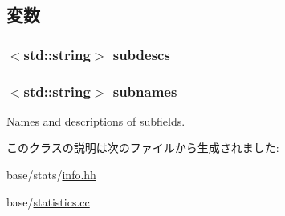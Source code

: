 \subsection{変数}
\hypertarget{classStats_1_1VectorInfo_a722488efce925fb896e4111f77731f25}{
\subsubsection[{subdescs}]{$<$std::string$>$ {\bf subdescs}}}
\label{classStats_1_1VectorInfo_a722488efce925fb896e4111f77731f25}
\hypertarget{classStats_1_1VectorInfo_a3b95ca426d97cab365cc623926fdd294}{
\subsubsection[{subnames}]{$<$std::string$>$ {\bf subnames}}}
\label{classStats_1_1VectorInfo_a3b95ca426d97cab365cc623926fdd294}
Names and descriptions of subfields. 

このクラスの説明は次のファイルから生成されました:\begin{DoxyCompactItemize}
\item 
base/stats/\hyperlink{info_8hh}{info.hh}\item 
base/\hyperlink{statistics_8cc}{statistics.cc}\end{DoxyCompactItemize}
